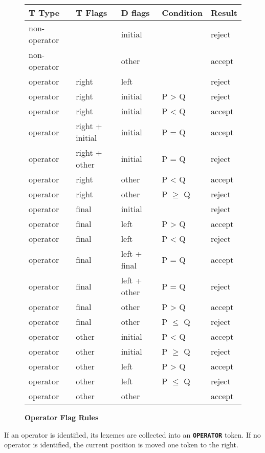 \documentclass[12pt]{article}
\newcommand{\TT}[1]{{\tt \bfseries #1}}
\newlength{\figurewidth}
\newenvironment{boxedfigure}[1][!btp]%
	{\begin{figure*}[#1]
	 \begin{lrbox}{\figurebox}
	 \begin{minipage}{\figurewidth}

	 \vspace*{1ex}}%
	{
	 \vspace*{1ex}

	 \end{minipage}
	 \end{lrbox}

	 \centering
	 \fbox{\hspace*{0.1in}\usebox{\figurebox}\hspace*{0.1in}}
	 \end{figure*}}
\begin{document}
\begin{boxedfigure}[!t]
\begin{center}
\begin{tabular}{lllll}
T Type		& T Flags
			& D flags	& Condition	& Result
\\\hline
non-operator	&	& initial	&	& reject \\
non-operator	&	& other	 	&	& accept
\\[0.5ex]
operator	& right & left		&	& reject \\
operator	& right & initial	& P > Q	& reject \\
operator	& right & initial	& P < Q	& accept \\
operator	& right + initial
			& initial	& P = Q	& accept \\
operator	& right + other
			& initial	& P = Q & reject \\
operator	& right & other		& P < Q	& accept \\
operator	& right & other		& P $\ge$ Q	& reject
\\[0.5ex]
operator	& final & initial	&	& reject \\
operator	& final & left		& P > Q	& accept \\
operator	& final & left		& P < Q	& reject \\
operator	& final & left + final 	& P = Q	& accept \\
operator	& final & left + other	& P = Q	& reject \\
operator	& final & other		& P > Q	& accept \\
operator	& final & other		& P $\le$ Q	& reject
\\[0.5ex]
operator	& other	 & initial	& P < Q	& accept \\
operator	& other	 & initial	& P $\ge$ Q	& reject \\
operator	& other	 & left		& P > Q	& accept \\
operator	& other	 & left		& P $\le$ Q	& reject \\
operator	& other	 & other	& 	& accept \\

\end{tabular}
\end{center}

\caption{\bf Operator Flag Rules}
\label{OPERATOR-FLAG-RULES}
\end{boxedfigure}

If an operator is identified, its lexemes are collected into
an \TT{OPERATOR} token.  If no operator is identified, the
current position is moved one token to the right.
\end{document}
